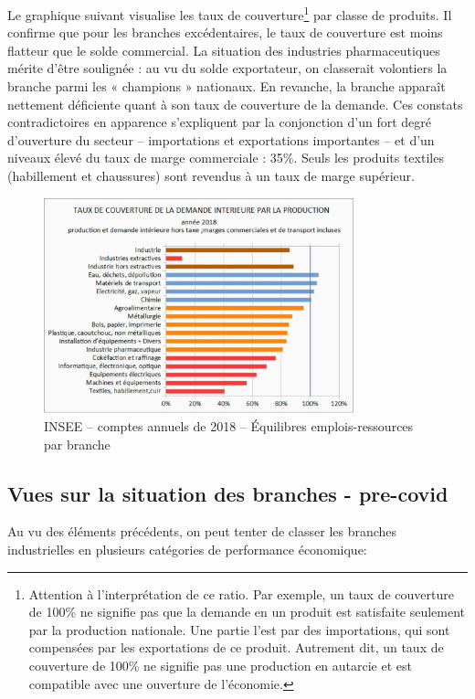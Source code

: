 \documentclass[a4paper]{article}
\begin{document}
Le graphique suivant visualise les taux de couverture\footnote{Attention à l’interprétation de ce ratio. Par exemple, un taux de couverture de 100\% ne signifie pas que la demande en un produit est satisfaite seulement par la production nationale. Une partie l’est par des importations, qui sont compensées par les exportations de ce produit. Autrement dit, un taux de couverture de 100\% ne signifie pas une production en autarcie et est compatible avec une ouverture de l’économie.} par classe de produits. Il confirme que pour les branches excédentaires, le taux de couverture est moins flatteur que le solde commercial. La situation des industries pharmaceutiques mérite d’être soulignée : au vu du solde exportateur, on classerait volontiers la branche parmi les « champions » nationaux.  En revanche, la branche apparaît nettement déficiente quant à son taux de couverture de la demande. Ces constats contradictoires en apparence s’expliquent par la conjonction d’un fort degré d’ouverture du secteur – importations et exportations importantes – et d’un niveaux élevé du taux de marge commerciale : 35\%. Seuls les produits textiles (habillement et chaussures) sont revendus à un taux de marge supérieur.

\begin{figure}[H]
    \centering
    \includegraphics*[width=0.8\textwidth]{images/couverture}
    \caption{INSEE – comptes annuels de 2018 – Équilibres emplois-ressources par branche}
    \label{fig:couverture}
\end{figure}

\subsection{Vues sur la situation des branches - pre-covid}
Au vu des éléments précédents, on peut tenter de classer les branches industrielles en plusieurs catégories de performance économique: 
\end{document}
